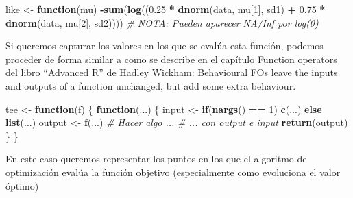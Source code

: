 \documentclass[
]{book}
\newenvironment{Shaded}{\begin{snugshade}}{\end{snugshade}}
\newcommand{\CommentTok}[1]{\textcolor[rgb]{0.56,0.35,0.01}{\textit{#1}}}
\newcommand{\ControlFlowTok}[1]{\textcolor[rgb]{0.13,0.29,0.53}{\textbf{#1}}}
\newcommand{\DecValTok}[1]{\textcolor[rgb]{0.00,0.00,0.81}{#1}}
\newcommand{\FloatTok}[1]{\textcolor[rgb]{0.00,0.00,0.81}{#1}}
\newcommand{\KeywordTok}[1]{\textcolor[rgb]{0.13,0.29,0.53}{\textbf{#1}}}
\newcommand{\NormalTok}[1]{#1}
\newcommand{\OperatorTok}[1]{\textcolor[rgb]{0.81,0.36,0.00}{\textbf{#1}}}
\newcommand{\StringTok}[1]{\textcolor[rgb]{0.31,0.60,0.02}{#1}}
\theoremstyle{break}
\theoremstyle{definition}
\theoremstyle{definition}
\theoremstyle{definition}
\theoremstyle{remark}
\begin{document}
\begin{Shaded}
\begin{Highlighting}[]
\NormalTok{like <-}\StringTok{ }\ControlFlowTok{function}\NormalTok{(mu)}
  \OperatorTok{-}\KeywordTok{sum}\NormalTok{(}\KeywordTok{log}\NormalTok{((}\FloatTok{0.25} \OperatorTok{*}\StringTok{ }\KeywordTok{dnorm}\NormalTok{(data, mu[}\DecValTok{1}\NormalTok{], sd1) }\OperatorTok{+}\StringTok{ }\FloatTok{0.75} \OperatorTok{*}\StringTok{ }\KeywordTok{dnorm}\NormalTok{(data, mu[}\DecValTok{2}\NormalTok{], sd2))))}
  \CommentTok{# NOTA: Pueden aparecer NA/Inf por log(0)}
\end{Highlighting}
\end{Shaded}

Si queremos capturar los valores en los que se evalúa esta función,
podemos proceder de forma similar a como se describe en el capítulo
\href{http://adv-r.had.co.nz/Function-operators.html\#behavioural-fos}{Function operators}
del libro ``Advanced R'' de Hadley Wickham:
Behavioural FOs leave the inputs and outputs of a function unchanged,
but add some extra behaviour.

\begin{Shaded}
\begin{Highlighting}[]
\NormalTok{tee <-}\StringTok{ }\ControlFlowTok{function}\NormalTok{(f) \{}
  \ControlFlowTok{function}\NormalTok{(...) \{}
\NormalTok{    input <-}\StringTok{ }\ControlFlowTok{if}\NormalTok{(}\KeywordTok{nargs}\NormalTok{() }\OperatorTok{==}\StringTok{ }\DecValTok{1}\NormalTok{) }\KeywordTok{c}\NormalTok{(...) }\ControlFlowTok{else} \KeywordTok{list}\NormalTok{(...)}
\NormalTok{    output <-}\StringTok{ }\KeywordTok{f}\NormalTok{(...)}
    \CommentTok{# Hacer algo ...}
    \CommentTok{# ... con output e input}
    \KeywordTok{return}\NormalTok{(output)}
\NormalTok{  \}}
\NormalTok{\}}
\end{Highlighting}
\end{Shaded}

En este caso queremos representar los puntos en los que el algoritmo de optimización
evalúa la función objetivo (especialmente como evoluciona el valor óptimo)
\end{document}
